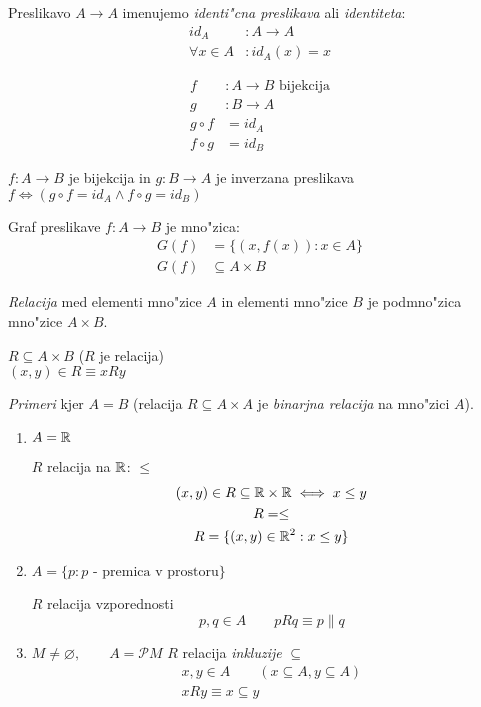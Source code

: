 Preslikavo $A \rightarrow A$ imenujemo \emph{identi"cna preslikava} ali \emph{identiteta}:
\begin{align*}
id_A&: A \rightarrow A\\
\forall x \in A&: id_A(x) = x
\end{align*}

\begin{align*}
f&: A \rightarrow B \text{ bijekcija}\\
g&: B \rightarrow A\\
g \circ f &= id_A\\
f \circ g &= id_B
\end{align*}

$f: A\rightarrow B$ je bijekcija in $g: B\rightarrow A$ je inverzana preslikava $f \iff (g \circ f = id_A \land f \circ g = id_B)$

Graf preslikave $f: A \rightarrow B$ je mno"zica:
\begin{align*}
G(f) &= \{(x, f(x)): x \in A\}\\
G(f) &\subseteq A \times B
\end{align*}

\emph{Relacija} med elementi mno"zice $A$ in elementi mno"zice $B$ je podmno"zica mno"zice $A \times B$.

$R \subseteq A\times B$ ($R$ je relacija)\\
$(x, y) \in R \equiv x R y$

\emph{Primeri} kjer $A = B$ (relacija $R \subseteq A \times A$ je \emph{binarjna relacija} na mno"zici $A$).
\begin{enumerate}[(1)]
	\item $A = \mathbb{R}$
	
	$R$ relacija na $\mathbb{R}$: $\leq$
	\begin{gather*}
	(x, y) \in R \subseteq \mathbb{R} \times \mathbb{R} \iff x \leq y\\
	R = \leq\\
	R = \{(x, y) \in \mathbb{R}^2: x \leq y\}
	\end{gather*}
	
	\item $A = \{p: \text{$p$ - premica v prostoru}\}$
	
	$R$ relacija vzporednosti
	\begin{equation*}
	p, q \in A \qquad p R q \equiv p \parallel q
	\end{equation*}
	
	\item $M \neq \varnothing, \qquad A = \mathcal{P}M$
	$R$ relacija \emph{inkluzije} $\subseteq$
	\begin{gather*}
		x, y \in A \qquad (x \subseteq A, y \subseteq A)\\
		x R y \equiv x \subseteq y
	\end{gather*}
\end{enumerate}

